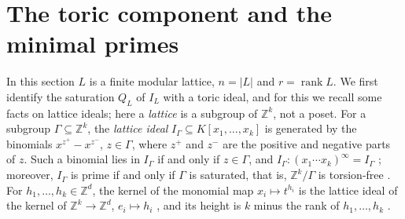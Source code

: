 \documentclass{amsart}
\theoremstyle{definition}
\DeclareMathOperator{\rk}{rank}
\newcommand{\cD}{\mathcal D}
\newcommand{\cN}{\mathcal N}
\newcommand{\Z}{\mathbb Z}
\begin{document}
%



\section{The toric component and the minimal primes}\label{sec:toric}

In this section $L$ is a finite modular lattice, $n=|L|$ and $r=\rk L$. We first identify the saturation $Q_L$ of $I_L$ with a toric ideal, and for this we recall some facts on lattice ideals; here a \emph{lattice} is a subgroup of $\Z^k$, not a poset. For a subgroup $\Gamma\subseteq\Z^k$, the \emph{lattice ideal} $I_\Gamma\subseteq K[x_1,\dots,x_k]$ is generated by the binomials $x^{z^+}-x^{z^-}$, $z\in\Gamma$, where $z^+$ and $z^-$ are the positive and negative parts of $z$. Such a binomial lies in $I_\Gamma$ if and only if $z\in\Gamma$, and $I_\Gamma:(x_1\cdots x_k)^\infty=I_\Gamma$ \cite[Theorem 3.20 and its proof]{HHO}; moreover, $I_\Gamma$ is prime if and only if $\Gamma$ is saturated, that is, $\Z^k/\Gamma$ is torsion-free \cite[Theorem 3.17]{HHO}. For $h_1,\dots,h_k\in\Z^d$, the kernel of the monomial map $x_i\mapsto t^{h_i}$ is the lattice ideal of the kernel of $\Z^k\to\Z^d$, $e_i\mapsto h_i$ \cite[Proposition 3.16]{HHO}, and its height is $k$ minus the rank of $h_1,\dots,h_k$ \cite[Proposition 3.1]{HHO}.
\end{document}
